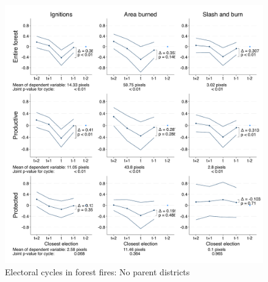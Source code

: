 \documentclass[11pt,a4paper]{article}
\begin{document}
\begin{figure}[H]
	\caption{Electoral cycles in forest fires: No parent districts}
    \centering
    \includegraphics[width=1\linewidth]{../output/figures/figure_c2.pdf}
\end{figure}
\end{document}
